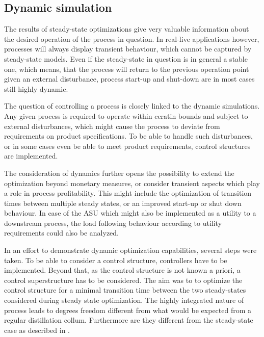     \subsection{Dynamic simulation}
    The results of steady-state optimizations give very valuable information about the desired operation of
    the process in question. In real-live applications however, processes will always display transient behaviour,
    which cannot be captured by steady-state models. Even if the steady-state in question is in general a stable one,
    which means, that the process will return to the previous operation point given an external disturbance, process
    start-up and shut-down are in most cases still highly dynamic.

    The question of controlling a process is closely linked to the dynamic simulations. Any given process is required
    to operate within ceratin bounds and subject to external disturbances, which might cause the process to deviate
    from requirements on product specifications. To be able to handle such disturbances, or in some cases even be able
    to meet product requirements, control structures are implemented.

    The consideration of dynamics further opens the possibility to extend the optimization beyond monetary measures, or
    consider transient aspects which play a role in process profitability. This might include the optimization of transition
    times between multiple steady states, or an improved start-up or shut down behaviour. In case of the ASU which might also
    be implemented as a utility to a downstream process, the load following behaviour according to utility requirements could
    also be analyzed.

    In an effort to demonstrate dynamic optimization capabilities, several steps were taken. To be able to consider a control
    structure, controllers have to be implemented. Beyond that, as the control structure is not known a priori, a control
    superstructure has to be considered. The aim was to to optimize the control structure for a minimal transition time between
    the two steady-states considered during steady state optimization. The highly integrated nature of process leads to degrees
    freedom different from what would be expected from a regular distillation collum. Furthermore are they different
    from the steady-state case as described in .

